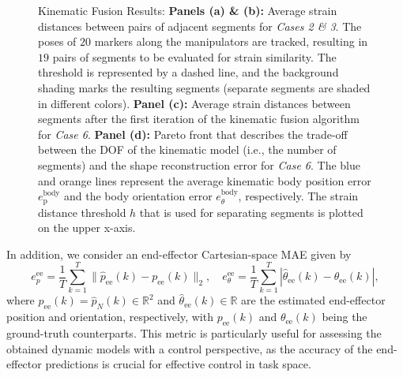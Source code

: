 \begin{figure}[ht]
    \caption{
    Kinematic Fusion Results:
    \textbf{Panels (a) \& (b):} Average strain distances between pairs of adjacent segments for \emph{Cases 2 \& 3}. The poses of $20$ markers along the manipulators are tracked, resulting in $19$ pairs of segments to be evaluated for strain similarity. The threshold is represented by a dashed line, and the background shading marks the resulting segments (separate segments are shaded in different colors).
    \textbf{Panel (c):} Average strain distances between segments after the first iteration of the kinematic fusion algorithm for \emph{Case 6}. \textbf{Panel (d):} Pareto front that describes the trade-off between the DOF of the kinematic model (i.e., the number of segments) and the shape reconstruction error for \emph{Case 6}.
    The blue and orange lines represent the average kinematic body position error $e_\mathrm{p}^\mathrm{body}$ and the body orientation error $e_\theta^\mathrm{body}$, respectively.
    The strain distance threshold $h$ that is used for separating segments is plotted on the upper x-axis.
    }\label{fig:pcsregression:results:kinematic_fusion}
\end{figure}

In addition, we consider an end-effector Cartesian-space \gls{MAE} given by
\begin{equation}
    e_p^{\mathrm{ee}} = \frac{1}{ T} \sum_{k=1}^T \lVert \hat{p}_\mathrm{ee}(k) - p_\mathrm{ee}(k) \rVert_2,
    \quad
    e_{\theta}^{\mathrm{ee}}=\frac{1}{T} \sum_{k=1}^T | \hat{\theta}_\mathrm{ee}(k) - \theta_\mathrm{ee}(k) |,
\end{equation}
where $\hat{p}_\mathrm{ee}(k) = \hat{p}_{N}(k) \in \mathbb{R}^2$ and $\hat{\theta}_\mathrm{ee}(k) \in \mathbb{R}$ are the estimated end-effector position and orientation, respectively, with $p_\mathrm{ee}(k)$ and $\theta_\mathrm{ee}(k)$ being the ground-truth counterparts. 
This metric is particularly useful for assessing the obtained dynamic models with a control perspective, as the accuracy of the end-effector predictions is crucial for effective control in task space.

